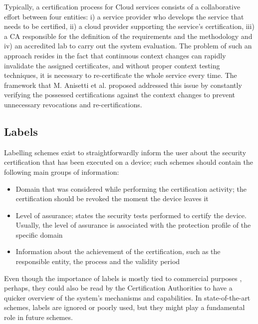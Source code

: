 Typically, a certification process for Cloud services consists of a collaborative effort between four entities: i) a service provider who develops the service that needs to be certified, ii) a cloud provider supporting the service's certification, iii) a CA responsible for the definition of the requirements and the methodology and iv) an accredited lab to carry out the system evaluation. The problem of such an approach resides in the fact that continuous context changes can rapidly invalidate the assigned certificates, and without proper context testing techniques, it is necessary to re-certificate the whole service every time. The framework that M. Anisetti et al. proposed addressed this issue by constantly verifying the possessed certifications against the context changes to prevent unnecessary revocations and re-certifications.


\subsection{Labels}
Labelling schemes exist to straightforwardly inform the user about the security certification that has been executed on a device; such schemes should contain the following main groups of information:

\begin{itemize}
    \item Domain that was considered while performing the certification activity; the certification should be revoked the moment the device leaves it

    \item Level of assurance; states the security tests performed to certify the device. Usually, the level of assurance is associated with the protection profile of the specific domain

    \item  Information about the achievement of the certification, such as the responsible entity, the process and the validity period

\end{itemize}

Even though the importance of labels is mostly tied to commercial purposes \cite{baldini2016security}, perhaps, they could also be read by the Certification Authorities to have a quicker overview of the system's mechanisms and capabilities. In state-of-the-art schemes, labels are ignored or poorly used, but they might play a fundamental role in future schemes.



